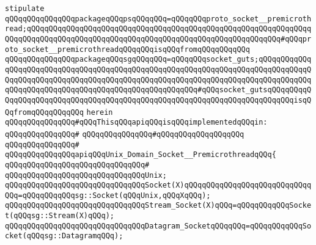 \newline
\newline
\verb|stipulate|\newline
\verb|qQQqqQQqqQQqqQQqpackageqQQqpsqQQqqQQq=qQQqqQQqproto_socket__premicrothread;qQQqqQQqqQQqqQQqqQQqqQQqqQQqqQQqqQQqqQQqqQQqqQQqqQQqqQQqqQQqqQQqqQQqqQQqqQQqqQQqqQQqqQQqqQQqqQQqqQQqqQQqqQQqqQQqqQQqqQQqqQQqqQQq#qQQqproto_socket__premicrothreadqQQqqQQqisqQQqfromqQQqqQQqqQQq|\newline
\verb|qQQqqQQqqQQqqQQqpackageqQQqsgqQQqqQQq=qQQqqQQqsocket_guts;qQQqqQQqqQQqqQQqqQQqqQQqqQQqqQQqqQQqqQQqqQQqqQQqqQQqqQQqqQQqqQQqqQQqqQQqqQQqqQQqqQQqqQQqqQQqqQQqqQQqqQQqqQQqqQQqqQQqqQQqqQQqqQQqqQQqqQQqqQQqqQQqqQQqqQQqqQQqqQQqqQQqqQQqqQQqqQQqqQQqqQQqqQQqqQQqqQQq#qQQqsocket_gutsqQQqqQQqqQQqqQQqqQQqqQQqqQQqqQQqqQQqqQQqqQQqqQQqqQQqqQQqqQQqqQQqqQQqqQQqqQQqisqQQqfromqQQqqQQqqQQq|\newline
\newline
\verb|herein|\newline
\newline
\verb|qQQqqQQqqQQqqQQq#qQQqThisqQQqapiqQQqisqQQqimplementedqQQqin:|\newline
\verb|qQQqqQQqqQQqqQQq#|\newline
\verb|qQQqqQQqqQQqqQQq#qQQqqQQqqQQqqQQqqQQq|\newline
\verb|qQQqqQQqqQQqqQQq#|\newline
\verb|qQQqqQQqqQQqqQQqapiqQQqUnix_Domain_Socket__PremicrothreadqQQq{|\newline
\verb|qQQqqQQqqQQqqQQqqQQqqQQqqQQqqQQq#|\newline
\verb|qQQqqQQqqQQqqQQqqQQqqQQqqQQqqQQqUnix;|\newline
\newline
\verb|qQQqqQQqqQQqqQQqqQQqqQQqqQQqqQQqSocket(X)qQQqqQQqqQQqqQQqqQQqqQQqqQQqqQQq=qQQqqQQqqQQqsg::Socket(qQQqUnix,qQQqXqQQq);|\newline
\verb|qQQqqQQqqQQqqQQqqQQqqQQqqQQqqQQqStream_Socket(X)qQQq=qQQqqQQqqQQqSocket(qQQqsg::Stream(X)qQQq);|\newline
\verb|qQQqqQQqqQQqqQQqqQQqqQQqqQQqqQQqDatagram_SocketqQQqqQQq=qQQqqQQqqQQqSocket(qQQqsg::DatagramqQQq);|\newline
